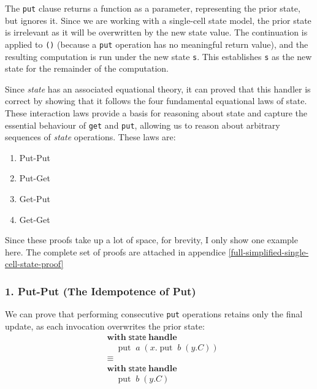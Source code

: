 \documentclass[logo,bsc,singlespacing,parskip]{infthesis}
\begin{document}
The \lstinline{put} clause returns a function as a parameter, representing the prior state, but ignores it. Since we are working with a single-cell state model, the prior state is irrelevant as it will be overwritten by the new state value. The continuation is applied to \lstinline{()} (because a \lstinline{put} operation has no meaningful return value), and the resulting computation is run under the new state \lstinline{s}. This establishes \lstinline{s} as the new state for the remainder of the computation.

Since \textit{state} has an associated equational theory, it can proved that this handler is correct by showing that it follows the four fundamental equational laws of state. These interaction laws provide a basis for reasoning about state and capture the essential behaviour of \lstinline{get} and \lstinline{put}, allowing us to reason about arbitrary sequences of \textit{state} operations. These laws are:

\begin{enumerate}
    \item Put-Put 
    \item Put-Get
    \item Get-Put
    \item Get-Get
\end{enumerate}

Since these proofs take up a lot of space, for brevity, I only show one example here. The complete set of proofs are attached in appendice \ref{full-simplified-single-cell-state-proof} 

\subsubsection*{1. Put-Put (The Idempotence of Put)}
We can prove that performing consecutive \lstinline{put} operations retains only the final update, as each invocation overwrites the prior state:
\[
\begin{aligned}
    &\mathsf{\textbf{with}} \; \mathsf{state} \; \mathsf{\textbf{handle}} \\
    &\quad \operatorname{put} \; a \; (x. \operatorname{put} \; b \; (y. C)) \\
    &\equiv \\
    &\mathsf{\textbf{with}} \; \mathsf{state} \; \mathsf{\textbf{handle}} \\
    &\quad \operatorname{put} \; b \; (y. C)
\end{aligned}
\]
\end{document}
